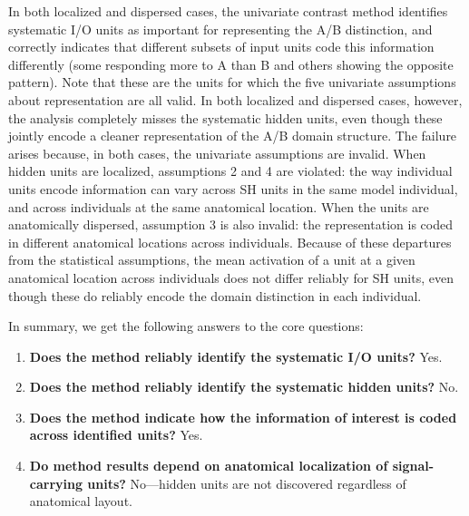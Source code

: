 In both localized and dispersed cases, the univariate contrast method identifies systematic I/O units as important for representing the A/B distinction, and correctly indicates that different subsets of input units code this information differently (some responding more to A than B and others showing the opposite pattern). Note that these are the units for which the five univariate assumptions about representation are all valid. In both localized and dispersed cases, however, the analysis completely misses the systematic hidden units, even though these jointly encode a cleaner representation of the A/B domain structure. The failure arises because, in both cases, the univariate assumptions are invalid. When hidden units are localized, assumptions 2 and 4 are violated: the way individual units encode information can vary across SH units in the same model individual, and across individuals at the same anatomical location. When the units are anatomically dispersed, assumption 3 is also invalid: the representation is coded in different anatomical locations across individuals. Because of these departures from the statistical assumptions, the mean activation of a unit at a given anatomical location across individuals does not differ reliably for SH units, even though these do reliably encode the domain distinction in each individual.

In summary, we get the following answers to the core questions:

\begin{enumerate}
\item {\bf Does the method reliably identify the systematic I/O units?} Yes.
\item {\bf Does the method reliably identify the systematic hidden units?} No.
\item {\bf Does the method indicate how the information of interest is coded across identified units?} Yes.
\item {\bf Do method results depend on anatomical localization of signal-carrying units?} No---hidden units are not discovered regardless of anatomical layout.
\end{enumerate}
